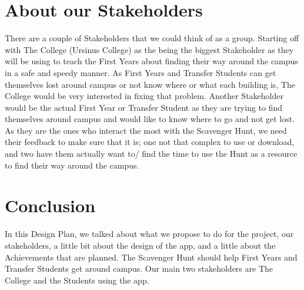\documentclass[twoside,twocolumn]{article}
\begin{document}


\section{About our Stakeholders}
\par There are a couple of Stakeholders that we could think of as a group. Starting off with The College (Ursinus College) as the being the biggest Stakeholder as they will be using to teach the First Years about finding their way around the campus in a safe and speedy manner. As First Years and Transfer Students can get themselves lost around campus or not know where or what each building is, The College would be very interested in fixing that problem. Another Stakeholder would be the actual First Year or Transfer Student as they are trying to find themselves around campus and would like to know where to go and not get lost. As they are the ones who interact the most with the Scavenger Hunt, we need their feedback to make sure that it is; one not that complex to use or download, and two have them actually want to/ find the time to use the Hunt as a resource to find their way around the campus.


\section{Conclusion}
In this Design Plan, we talked about what we propose to do for the project, our stakeholders, a little bit about the design of the app, and a little about the Achievements that are planned. The Scavenger Hunt should help First Years and Transfer Students get around campus. Our main two stakeholders are The College and the Students using the app. 



\printbibliography %

\end{document}
